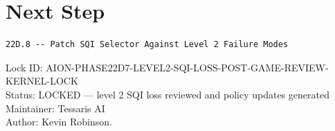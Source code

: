 \documentclass[11pt,a4paper]{article}
\begin{document}
\section{Next Step}

\begin{verbatim}
22D.8 -- Patch SQI Selector Against Level 2 Failure Modes
\end{verbatim}

\bigskip

\noindent
Lock ID: AION-PHASE22D7-LEVEL2-SQI-LOSS-POST-GAME-REVIEW-KERNEL-LOCK\\
Status: LOCKED --- level 2 SQI loss reviewed and policy updates generated\\
Maintainer: Tessaris AI\\
Author: Kevin Robinson.
\end{document}
